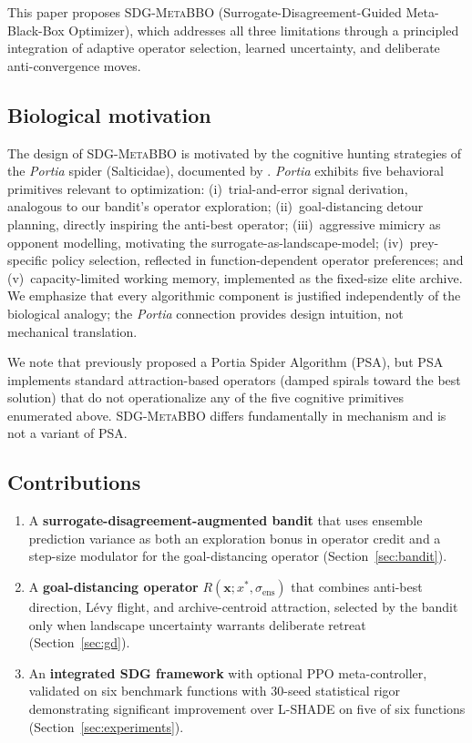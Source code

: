 \documentclass[preprint,12pt,number]{elsarticle}
\newcommand{\sdg}{\textsc{SDG-MetaBBO}}
\newcommand{\xbest}{x^*}
\newcommand{\sigmaens}{\sigma_{\text{ens}}}
\begin{document}
This paper proposes \sdg{} (Surrogate-Disagreement-Guided Meta-Black-Box Optimizer), which addresses all three limitations through a principled integration of adaptive operator selection, learned uncertainty, and deliberate anti-convergence moves.

\subsection{Biological motivation}

The design of \sdg{} is motivated by the cognitive hunting strategies of the \emph{Portia} spider (Salticidae), documented by \cite{Jackson2011}. \emph{Portia} exhibits five behavioral primitives relevant to optimization: (i)~trial-and-error signal derivation, analogous to our bandit's operator exploration; (ii)~goal-distancing detour planning, directly inspiring the anti-best operator; (iii)~aggressive mimicry as opponent modelling, motivating the surrogate-as-landscape-model; (iv)~prey-specific policy selection, reflected in function-dependent operator preferences; and (v)~capacity-limited working memory, implemented as the fixed-size elite archive. We emphasize that every algorithmic component is justified independently of the biological analogy; the \emph{Portia} connection provides design intuition, not mechanical translation.

We note that \cite{Pham2024} previously proposed a Portia Spider Algorithm (PSA), but PSA implements standard attraction-based operators (damped spirals toward the best solution) that do not operationalize any of the five cognitive primitives enumerated above. \sdg{} differs fundamentally in mechanism and is not a variant of PSA.

\subsection{Contributions}

\begin{enumerate}
\item A \textbf{surrogate-disagreement-augmented bandit} that uses ensemble prediction variance as both an exploration bonus in operator credit and a step-size modulator for the goal-distancing operator (Section~\ref{sec:bandit}).

\item A \textbf{goal-distancing operator} $R(\mathbf{x}; \xbest, \sigmaens)$ that combines anti-best direction, L\'evy flight, and archive-centroid attraction, selected by the bandit only when landscape uncertainty warrants deliberate retreat (Section~\ref{sec:gd}).

\item An \textbf{integrated SDG framework} with optional PPO meta-controller, validated on six benchmark functions with 30-seed statistical rigor demonstrating significant improvement over L-SHADE on five of six functions (Section~\ref{sec:experiments}).
\end{enumerate}
\end{document}
